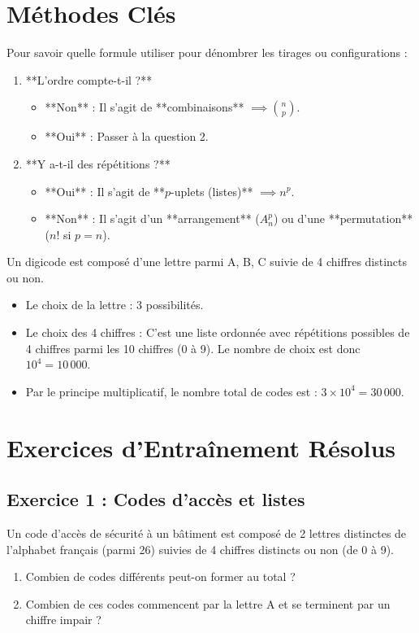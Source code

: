 \section{Méthodes Clés}

\begin{methode}
Pour savoir quelle formule utiliser pour dénombrer les tirages ou configurations :
\begin{enumerate}
    \item **L'ordre compte-t-il ?**
    \begin{itemize}
        \item **Non** : Il s'agit de **combinaisons** $\implies \binom{n}{p}$.
        \item **Oui** : Passer à la question 2.
    \end{itemize}
    \item **Y a-t-il des répétitions ?**
    \begin{itemize}
        \item **Oui** : Il s'agit de **$p$-uplets (listes)** $\implies n^p$.
        \item **Non** : Il s'agit d'un **arrangement** ($A_n^p$) ou d'une **permutation** ($n!$ si $p=n$).
    \end{itemize}
\end{enumerate}
\end{methode}

\begin{exemple}
Un digicode est composé d'une lettre parmi A, B, C suivie de 4 chiffres distincts ou non.
\begin{itemize}
    \item Le choix de la lettre : 3 possibilités.
    \item Le choix des 4 chiffres : C'est une liste ordonnée avec répétitions possibles de 4 chiffres parmi les 10 chiffres (0 à 9). Le nombre de choix est donc $10^4 = 10\,000$.
    \item Par le principe multiplicatif, le nombre total de codes est : $3 \times 10^4 = 30\,000$.
\end{itemize}
\end{exemple}

\section{Exercices d'Entraînement Résolus}

\subsection*{Exercice 1 : Codes d'accès et listes}
Un code d'accès de sécurité à un bâtiment est composé de 2 lettres distinctes de l'alphabet français (parmi 26) suivies de 4 chiffres distincts ou non (de 0 à 9).
\begin{enumerate}
    \item Combien de codes différents peut-on former au total ?
    \item Combien de ces codes commencent par la lettre A et se terminent par un chiffre impair ?
\end{enumerate}

